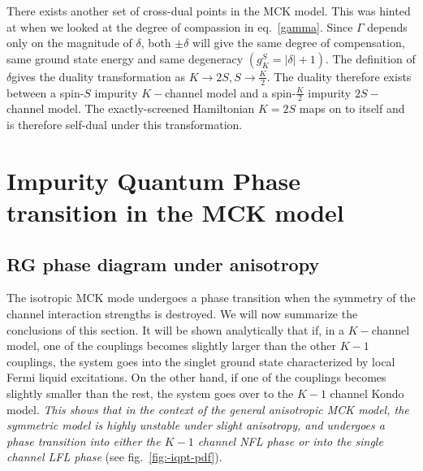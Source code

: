 \documentclass[reprint,prb,superscriptaddress]{revtex4-2}
\begin{document}
There exists another set of cross-dual points in the MCK model. This was hinted at when we looked at the degree of compassion in eq.~\ref{gamma}. Since \(\Gamma\) depends only on the magnitude of \(\delta\), both \(\pm \delta\) will give the same degree of compensation, same ground state energy and same degeneracy \(\left(g^S_K = |\delta|+1\right)\). The definition of \(\delta\)gives the duality transformation as \(K \to 2S, S \to \frac{K}{2}\). The duality therefore exists between a spin-\(S\) impurity \(K-\)channel model and a spin-\(\frac{K}{2}\) impurity \(2S-\)channel model. The exactly-screened Hamiltonian \(K=2S\) maps on to itself and is therefore self-dual under this transformation.



\section{Impurity Quantum Phase transition in the MCK model}

\subsection{RG phase diagram under anisotropy}
\label{anisotropic_rg}
The isotropic MCK mode undergoes a phase transition when the symmetry of the channel interaction strengths is destroyed. We will now summarize the conclusions of this section. It will be shown analytically that if, in a \(K-\)channel model, one of the couplings becomes slightly larger than the other \(K-1\) couplings, the system goes into the singlet ground state characterized by local Fermi liquid excitations. On the other hand, if one of the couplings becomes slightly smaller than the rest, the system goes over to the \(K-1\) channel Kondo model. \textit{This shows that in the context of the general anisotropic MCK model, the symmetric model is highly unstable under slight anisotropy, and undergoes a phase transition into either the \(K-1\) channel NFL phase or into the single channel LFL phase} (see fig.~\ref{fig:-iqpt-pdf}).
\end{document}
